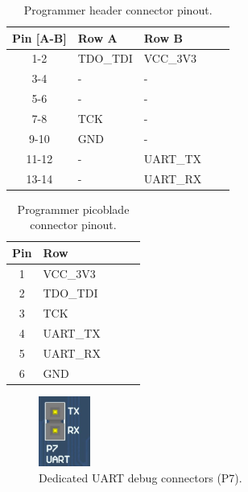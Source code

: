 \begin{table}[!ht]
    \centering
    \begin{tabular}{cllll}
        \toprule[1.5pt]
        \textbf{Pin [A-B]} & \textbf{Row A} & \textbf{Row B} \\
        \midrule
        1-2                & TDO\_TDI       & VCC\_3V3       \\
        3-4                & -              & -              \\
        5-6                & -              & -              \\
        7-8                & TCK            & -              \\
        9-10               & GND            & -              \\
        11-12              & -              & UART\_TX       \\
        13-14              & -              & UART\_RX       \\
        \bottomrule[1.5pt]
    \end{tabular}
    \caption{Programmer header connector pinout.}
    \label{tab:jtag-header-connector-pins}
\end{table}

\begin{table}[!ht]
    \centering
    \begin{tabular}{cllll}
        \toprule[1.5pt]
        \textbf{Pin} & \textbf{Row} \\
        \midrule
        1            & VCC\_3V3 \\
        2            & TDO\_TDI \\
        3            & TCK \\
        4            & UART\_TX \\
        5            & UART\_RX \\
        6            & GND \\
        \bottomrule[1.5pt]
    \end{tabular}
    \caption{Programmer picoblade connector pinout.}
    \label{tab:jtag-picoblade-connector-pins}
\end{table}

\begin{figure}[!ht]
    \begin{center}
        \includegraphics[width=0.15\textwidth]{figures/p7-connector.png}
        \caption{Dedicated UART debug connectors (P7).}
        \label{fig:uart-debug-connector}
    \end{center}
\end{figure}

